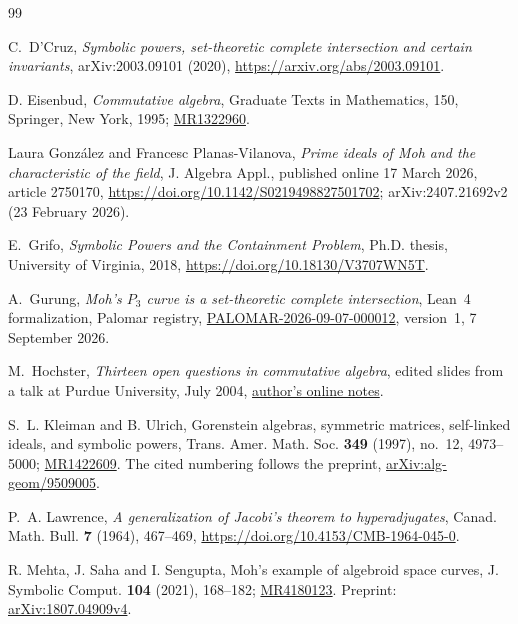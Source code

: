 \documentclass[11pt]{amsart}
\theoremstyle{remark}
\begin{document}
\begin{thebibliography}{99}

C.~D'Cruz,
\emph{Symbolic powers, set-theoretic complete intersection and certain invariants},
arXiv:2003.09101 (2020),
\url{https://arxiv.org/abs/2003.09101}.

D. Eisenbud, {\it Commutative algebra}, Graduate Texts in Mathematics, 150, Springer, New York, 1995; \href{https://mathscinet.ams.org/mathscinet/article?mr=1322960}{MR1322960}.

Laura Gonz\'alez and Francesc Planas-Vilanova,
\emph{Prime ideals of Moh and the characteristic of the field},
J. Algebra Appl., published online 17 March 2026, article 2750170,
\url{https://doi.org/10.1142/S0219498827501702};
arXiv:2407.21692v2 (23 February 2026).

E.~Grifo,
\emph{Symbolic Powers and the Containment Problem},
Ph.D. thesis, University of Virginia, 2018,
\url{https://doi.org/10.18130/V3707WN5T}.

A.~Gurung,
\emph{Moh's $P_3$ curve is a set-theoretic complete intersection},
Lean~4 formalization, Palomar registry,
\href{https://palomar-registry.org/entry.html?id=PALOMAR-2026-09-07-000012&version=1}{PALOMAR-2026-09-07-000012},
version~1, 7 September 2026.

M.~Hochster,
\emph{Thirteen open questions in commutative algebra},
edited slides from a talk at Purdue University, July 2004,
\href{https://sites.lsa.umich.edu/hochster/wp-content/uploads/sites/1337/2024/10/Lip.text_.pdf}{author's online notes}.

S.~L. Kleiman and B. Ulrich, Gorenstein algebras, symmetric matrices, self-linked ideals, and symbolic powers, Trans. Amer. Math. Soc. {\bf 349} (1997), no.~12, 4973--5000; \href{https://mathscinet.ams.org/mathscinet/article?mr=1422609}{MR1422609}.
The cited numbering follows the preprint,
\href{https://arxiv.org/abs/alg-geom/9509005}{arXiv:alg-geom/9509005}.

P.~A. Lawrence,
\emph{A generalization of Jacobi's theorem to hyperadjugates},
Canad. Math. Bull. \textbf{7} (1964), 467--469,
\url{https://doi.org/10.4153/CMB-1964-045-0}.

R. Mehta, J. Saha and I. Sengupta, Moh's example of algebroid space curves, J. Symbolic Comput. {\bf 104} (2021), 168--182; \href{https://mathscinet.ams.org/mathscinet/article?mr=4180123}{MR4180123}.
Preprint: \href{https://arxiv.org/abs/1807.04909v4}{arXiv:1807.04909v4}.


\end{thebibliography}
\end{document}
